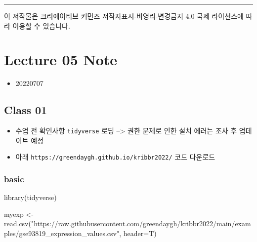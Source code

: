\documentclass[
]{book}
\newenvironment{Shaded}{\begin{snugshade}}{\end{snugshade}}
\newcommand{\AttributeTok}[1]{\textcolor[rgb]{0.77,0.63,0.00}{#1}}
\newcommand{\FunctionTok}[1]{\textcolor[rgb]{0.00,0.00,0.00}{#1}}
\newcommand{\NormalTok}[1]{#1}
\newcommand{\OtherTok}[1]{\textcolor[rgb]{0.56,0.35,0.01}{#1}}
\newcommand{\StringTok}[1]{\textcolor[rgb]{0.31,0.60,0.02}{#1}}
\providecommand{\tightlist}{%
  \setlength{\itemsep}{0pt}\setlength{\parskip}{0pt}}
\begin{document}
\begin{center}\rule{0.5\linewidth}{0.5pt}\end{center}

이 저작물은 크리에이티브 커먼즈 저작자표시-비영리-변경금지 4.0 국제 라이선스에 따라 이용할 수 있습니다.

\hypertarget{lecture-05-note}{%
\chapter{Lecture 05 Note}\label{lecture-05-note}}

\begin{itemize}
\tightlist
\item
  20220707
\end{itemize}

\hypertarget{class-01}{%
\section{Class 01}\label{class-01}}

\begin{itemize}
\tightlist
\item
  수업 전 확인사항 \texttt{tidyverse} 로딩 --\textgreater{} 권한 문제로 인한 설치 에러는 조사 후 업데이트 예정
\item
  아래 \texttt{https://greendaygh.github.io/kribbr2022/} 코드 다운로드
\end{itemize}

\hypertarget{basic}{%
\subsection{basic}\label{basic}}

\begin{Shaded}
\begin{Highlighting}[]
\FunctionTok{library}\NormalTok{(tidyverse)}

\NormalTok{myexp }\OtherTok{\textless{}{-}} \FunctionTok{read.csv}\NormalTok{(}\StringTok{"https://raw.githubusercontent.com/greendaygh/kribbr2022/main/examples/gse93819\_expression\_values.csv"}\NormalTok{, }\AttributeTok{header=}\NormalTok{T)}
\end{Highlighting}
\end{Shaded}
\end{document}
